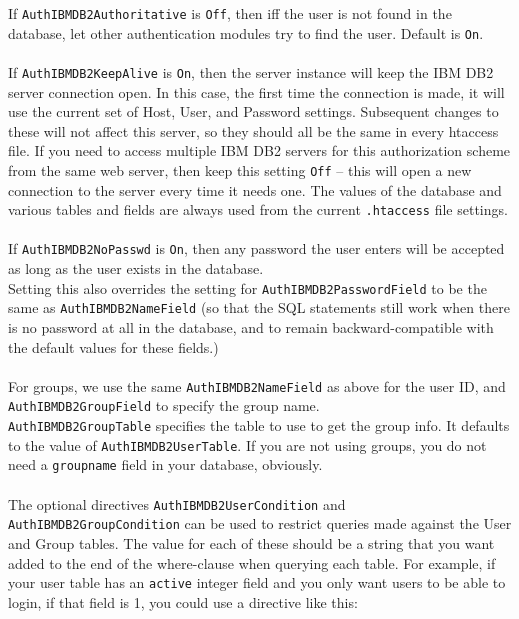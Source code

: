 \documentclass[11pt,letterpaper]{article}
\begin{document}
\newpage
\noindent
If {\tt AuthIBMDB2Authoritative} is {\tt Off}, then iff the user is not found in the database, let other authentication modules try to find the user. Default is {\tt On}. \\
\\
If {\tt AuthIBMDB2KeepAlive} is {\tt On}, then the server instance will keep the IBM DB2 server connection open.  In this case, the first time the connection is made, it will use the current set of Host, User, and Password settings.  Subsequent changes to these will not affect this server, so they should all be the same in every htaccess file. 
If you need to access multiple IBM DB2 servers for this authorization scheme from the same web server, then keep this setting {\tt Off} -- this will open a new connection to the server every time it needs one.  The values of the database and various tables and fields are always used from the current {\tt .htaccess} file settings.\\
\\
If {\tt AuthIBMDB2NoPasswd} is {\tt On}, then any password the user enters will be accepted as long as the user exists in the database.\\ Setting this also overrides the setting for {\tt AuthIBMDB2PasswordField} to be the same as {\tt AuthIBMDB2NameField} (so that the SQL statements still work when there is no password at all in the database, and to remain backward-compatible with the default values for these fields.)\\
\\
For groups, we use the same {\tt AuthIBMDB2NameField} as above for the user ID, and {\tt AuthIBMDB2GroupField} to specify the group name.\\ {\tt AuthIBMDB2GroupTable} specifies the table to use to get the group info.  It defaults to the value of {\tt AuthIBMDB2UserTable}.  If you are not using groups, you do not need a {\tt groupname} field in your database, obviously.\\
\\
The optional directives {\tt AuthIBMDB2UserCondition} and \\{\tt AuthIBMDB2GroupCondition} can be used to restrict queries made against the User and Group tables. The value for each of these should be a string that you want added to the end of the where-clause when querying each table.
For example, if your user table has an {\tt active} integer field and you only want users to be able to login, if that field is 1, you could use a directive like this:\\
\end{document}
